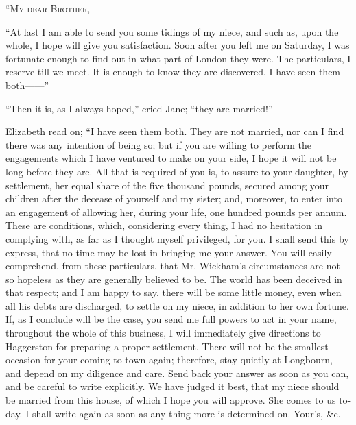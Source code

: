 \begin{letter}

“\textsc{My dear Brother},

“At last I am able to send you some tidings of my
niece, and such as, upon the whole, I hope will give you
satisfaction. Soon after you left me on Saturday, I was
fortunate enough to find out in what part of London they
were. The particulars, I reserve till we meet. It is enough
to know they are discovered, I have seen them both------”

“Then it is, as I always hoped,” cried Jane; “they
are married!”

Elizabeth read on; “I have seen them both. They
are not married, nor can I find there was any intention
of being so; but if you are willing to perform the engagements
which I have ventured to make on your side, I hope
it will not be long before they are. All that is required
of you is, to assure to your daughter, by settlement, her
equal share of the five thousand pounds, secured among
your children after the decease of yourself and my sister;
and, moreover, to enter into an engagement of allowing
her, during your life, one hundred pounds per annum.
These are conditions, which, considering every thing, I had
no hesitation in complying with, as far as I thought
myself privileged, for you. I shall send this by express,
that no time may be lost in bringing me your answer.
You will easily comprehend, from these particulars, that
Mr. Wickham’s circumstances are not so hopeless as they
are generally believed to be. The world has been deceived
in that respect; and I am happy to say, there will be
some little money, even when all his debts are discharged,
to settle on my niece, in addition to her own fortune.
If, as I conclude will be the case, you send me full powers
to act in your name, throughout the whole of this business,
I will immediately give directions to Haggerston for preparing
a proper settlement. There will not be the smallest
occasion for your coming to town again; therefore, stay
quietly at Longbourn, and depend on my diligence and care.
Send back your answer as soon as you can, and be careful
to write explicitly. We have judged it best, that my niece
should be married from this house, of which I hope you
will approve. She comes to us to-day. I shall write again
as soon as any thing more is determined on. Your’s, \&c.

\end{letter}

